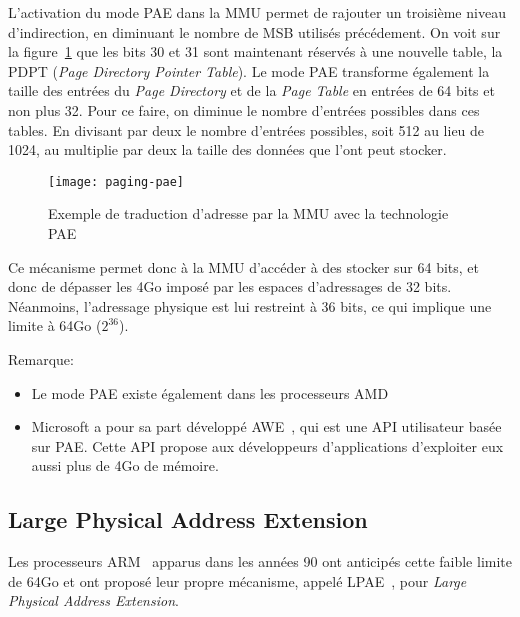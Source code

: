       L'activation du mode PAE dans la MMU permet de rajouter un troisième
      niveau d'indirection, en diminuant le nombre de MSB utilisés
      précédement. On voit sur la figure~\ref{fig:paging-pae} que les bits 30 et
      31 sont maintenant réservés à une nouvelle table, la PDPT (\textit{Page
        Directory Pointer Table}). Le mode PAE transforme également la taille
      des entrées du \textit{Page Directory} et de la \textit{Page Table} en
      entrées de 64 bits et non plus 32. Pour ce faire, on diminue le nombre
      d'entrées possibles dans ces tables. En divisant par deux le nombre
      d'entrées possibles, soit 512 au lieu de 1024, au multiplie par deux la
      taille des données que l'ont peut stocker.

      \begin{figure}[h]
        \centering \texttt{[image: paging-pae]}
        \caption{Exemple de traduction d'adresse par la MMU avec la technologie
          PAE}
        \label{fig:paging-pae}
      \end{figure}
      
      Ce mécanisme permet donc à la MMU d'accéder à des stocker sur 64 bits, et
      donc de dépasser les 4Go imposé par les espaces d'adressages de 32
      bits. Néanmoins, l'adressage physique est lui restreint à 36 bits, ce qui
      implique une limite à 64Go ($2^{36}$).

      \begin{paragraph}{Remarque:}
        \begin{itemize}
          \item Le mode PAE existe également dans les processeurs
            AMD~\citep{amd2000system}
          \item Microsoft a pour sa part développé
            AWE~\citep{russinovich2012windows}, qui est une API utilisateur
            basée sur PAE. Cette API propose aux développeurs d'applications
            d'exploiter eux aussi plus de 4Go de mémoire.
        \end{itemize}
      \end{paragraph}


    \subsection{Large Physical Address Extension}

    Les processeurs ARM~\cite{arm1990web} apparus dans les années 90 ont
    anticipés cette faible limite de 64Go et ont proposé leur propre mécanisme,
    appelé LPAE~\citep{arm2012principles,marinas2011linux}, pour \textit{Large
      Physical Address Extension}.

